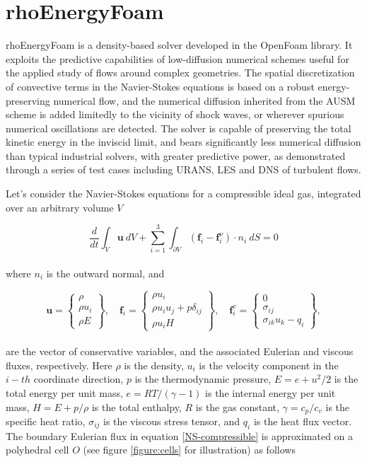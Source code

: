 \documentclass[a5paper]{sapthesis}
\begin{document}
	\section{rhoEnergyFoam}
	rhoEnergyFoam is a density-based solver developed in the OpenFoam library. It exploits the predictive capabilities of low-diffusion numerical schemes useful for the applied study of flows around complex geometries. The spatial discretization of convective terms in the Navier-Stokes equations is based on a robust energy-preserving numerical flow, and the numerical diffusion inherited from the AUSM scheme is added limitedly to the vicinity of shock waves, or wherever spurious numerical oscillations are detected. The solver is capable of preserving the total kinetic energy in the inviscid limit, and bears significantly less numerical diffusion than typical industrial solvers, with greater predictive power, as demonstrated through a series of test cases including URANS, LES and DNS of turbulent flows.  
	
	\noindent Let's consider the Navier-Stokes equations for a compressible ideal gas, integrated over an arbitrary volume $V$
	
	\begin{equation}
		\dfrac{d}{dt}\int_V \textbf{u} \ dV + \sum_{i=1}^{3} \int_{\partial{V}} (\textbf{f}_i-\textbf{f}_i^{\nu}) \cdot n_i \ dS = 0
		\label{NS-compressible}
	\end{equation}
	\\
	where  $n_i$ is the outward normal, and
	
	\begin{equation}
	\mathbf{u} =
	\begin{Bmatrix} 
		\rho \\ 
		\rho u_i \\ 
		\rho E 
	\end{Bmatrix}, \quad
	\mathbf{f}_i =
	\begin{Bmatrix} 
		\rho u_i \\ 
		\rho u_i u_j + p \delta_{ij} \\ 
		\rho u_i H 
	\end{Bmatrix}, \quad
	\mathbf{f}_i^v =
	\begin{Bmatrix} 
		0 \\ 
		\sigma_{ij} \\ 
		\sigma_{ik} u_k - q_i 
	\end{Bmatrix},
	\label{variables}
	\end{equation}
	\\
	are the vector of conservative variables, and the associated Eulerian and viscous fluxes, respectively. Here $\rho$ is the density, $ u_i$ is the velocity component in the $i-th$ coordinate direction, $p$ is the thermodynamic pressure, $ E = e + u^2/2 $ is the total energy per unit mass, $ e = RT/(\gamma - 1) $ is the internal energy per unit mass, $ H = E + p/\rho $ is the total enthalpy, $ R $ is the gas constant, $ \gamma = c_p/c_v $ is the specific heat ratio, $ \sigma_{ij} $ is the viscous stress tensor, and $ q_i $ is the heat flux vector.
	\\
	The boundary Eulerian flux in equation \ref{NS-compressible} is approximated on a polyhedral cell $ O $ (see figure \ref{figure:cells} for illustration) as follows
	
\end{document}
